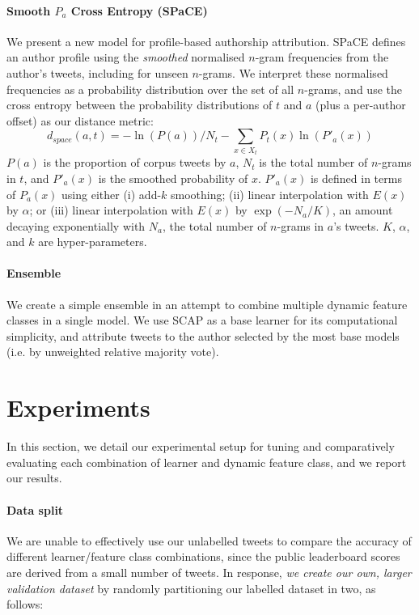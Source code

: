 \documentclass[twocolumn,10pt]{article}
\begin{document}
\paragraph{Smooth $P_a$ Cross Entropy (SPaCE)}
We present a new model for profile-based authorship attribution.
SPaCE defines an author profile using the \emph{smoothed}
normalised $n$-gram frequencies from the author's tweets,
including for unseen $n$-grams. 
We interpret these normalised frequencies as a probability
distribution over the set of all $n$-grams, and use the cross
entropy between the probability distributions of $t$ and $a$
(plus a per-author offset) as our distance metric:
$$
d_{space}(a, t) =
    - \ln (P(a)) / N_t
    - \sum_{x \in X_t} P_t(x) \ln (P'_a(x))
$$
$P(a)$ is the proportion of corpus tweets by $a$,
$N_t$ is the total number of $n$-grams in $t$, and
$P'_a(x)$ is the smoothed probability of $x$.
$P'_a(x)$ is defined in terms of $P_a(x)$ using either
(i)   add-$k$ smoothing;
(ii)  linear interpolation with $E(x)$ by $\alpha$; or
(iii) linear interpolation with $E(x)$ by $\exp(-N_a/K)$,
      an amount decaying exponentially with $N_a$,
      the total number of $n$-grams in $a$'s tweets.
$K$, $\alpha$, and $k$ are hyper-parameters.

\paragraph{Ensemble}
We create a simple ensemble in an attempt to combine multiple
dynamic feature classes in a single model.
We use SCAP as a base learner for its computational simplicity,
and attribute tweets to the author selected by the most
base models (i.e. by unweighted relative majority vote).




\section{Experiments}
In this section, we detail our experimental setup for tuning
and comparatively evaluating each combination of learner and dynamic feature class, and we report our results.

\paragraph{Data split}

We
are unable to effectively use our unlabelled tweets to compare
the accuracy of different learner/feature class combinations,
since the public leaderboard scores are derived from a small
number of tweets.
In response, \emph{we create our own, larger validation dataset}
by randomly partitioning our labelled dataset in two, as follows:
\end{document}
